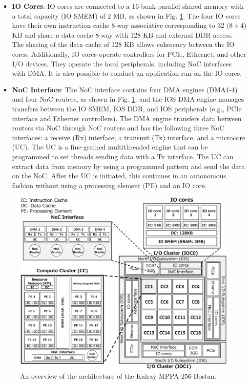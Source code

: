 \begin{itemize}
  \setlength{\leftskip}{-5mm}    
  \item \textbf{IO Cores}: IO cores are connected to a 16-bank parallel shared memory with a total capacity (IO SMEM) of 2 MB, as shown in Fig. \ref{fig:mppa_architecture}.
  The four IO cores have their own instruction cache 8-way associative corresponding to 32 ($8 \times 4$) KB and share a data cache 8-way with 128 KB and external DDR access.
  The sharing of the data cache of 128 KB allows coherency between the IO cores.
  Additionally, IO cores operate controllers for PCIe, Ethernet, and other I/O devices.
  They operate the local peripherals, including NoC interfaces with DMA.
  It is also possible to conduct an application run on the IO cores.
  
  \item \textbf{NoC Interface}: The NoC interface contains four DMA engines (DMA1-4) and four NoC routers, as shown in Fig. \ref{fig:mppa_architecture}, and the IOS DMA engine manages transfers between the IO SMEM, IOS DDR, and IOS peripherals (e.g., PCIe interface and Ethernet controllers).
  The DMA engine transfers data between routers via NoC through NoC routers and has the following three NoC interfaces: a receive (Rx) interface, a transmit (Tx) interface, and a microcore (UC).
  The UC is a fine-grained multithreaded engine that can be programmed to set threads sending data with a Tx interface.
  The UC can extract data from memory by using a programmed pattern and send the data on the NoC.
  After the UC is initiated, this continues in an autonomous fashion without using a processing element (PE) and an IO core.
\end{itemize}

\begin{figure}[thbp]
  \centering
  \includegraphics[width=0.9\linewidth]{../figure/mppa_architecture.eps}
      \caption{\label{fig:mppa_architecture}
    An overview of the architecture of the Kalray MPPA-256 Bostan.}
\end{figure}

